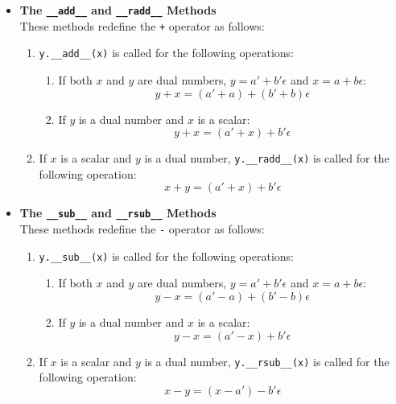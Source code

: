 \documentclass[a4paper,12pt]{article}
\begin{document}
\begin{itemize}
    \item \textbf{The \texttt{\_\_add\_\_} and \texttt{\_\_radd\_\_} Methods} \\
    These methods redefine the \texttt{+} operator as follows:
     \begin{enumerate}
      \item \texttt{y.\_\_add\_\_(x)} is called for the following operations:
    \begin{enumerate}
        \item If both \(x\) and \(y\) are dual numbers, \(y = a' + b'\epsilon\) and \(x = a + b\epsilon\):
        \[
        y + x = (a' + a) + (b' + b)\epsilon
        \]
        \item If \(y\) is a dual number and \(x\) is a scalar:
        \[
        y + x = (a' + x) + b'\epsilon
        \]
     \end{enumerate}
        \item If \(x\) is a scalar and \(y\) is a dual number, \texttt{y.\_\_radd\_\_(x)} is called for the following operation:
        \[
        x + y = (a' + x) + b'\epsilon
        \]
    \end{enumerate}

    \item \textbf{The \texttt{\_\_sub\_\_} and \texttt{\_\_rsub\_\_} Methods} \\
    These methods redefine the \texttt{-} operator as follows:
    \begin{enumerate}
      \item \texttt{y.\_\_sub\_\_(x)} is called for the following operations:
    \begin{enumerate}
        \item If both \(x\) and \(y\) are dual numbers, \(y = a' + b'\epsilon\) and \(x = a + b\epsilon\):
        \[
        y - x = (a' - a) + (b' - b)\epsilon
        \]
        \item If \(y\) is a dual number and \(x\) is a scalar:
        \[
        y - x = (a' - x) + b'\epsilon
        \]
     \end{enumerate}
        \item If \(x\) is a scalar and \(y\) is a dual number, \texttt{y.\_\_rsub\_\_(x)} is called for the following operation:
        \[
        x - y = (x - a') - b'\epsilon
        \]
    \end{enumerate}


\end{itemize}
\end{document}
